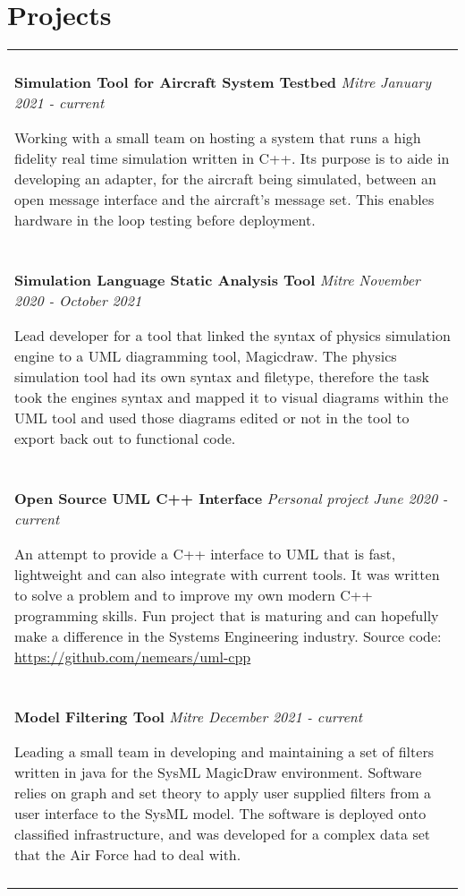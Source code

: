 \documentclass[10pt]{article}
\begin{document}
\section*{Projects}
\begin{tabular}{p{18.5cm}}
    \hline
    \multicolumn{1}{c}{} \\

    \large \textbf{Simulation Tool for Aircraft System Testbed} \normalsize \textit{Mitre \hfill January 2021 - current}

    \> Working with a small team on hosting a system that runs a high fidelity real time 
    simulation written in C++. Its purpose is to aide in developing an adapter, for the aircraft being simulated, between an open
    message interface and the aircraft's message set. This enables hardware in the loop testing before deployment.\\
    \multicolumn{1}{c}{} \\

    \large \textbf{Simulation Language Static Analysis Tool} \normalsize \textit{Mitre \hfill November 2020 - October 2021}  

    \> Lead developer for a tool that linked the syntax of physics simulation engine to a UML diagramming tool, Magicdraw. 
    The physics simulation tool had its own syntax and filetype, therefore the task took the engines syntax and mapped it 
    to visual diagrams within the UML tool and used those diagrams edited or not in the tool to export back out to functional code. \\
    \multicolumn{1}{c}{} \\

    \large \textbf{Open Source UML C++ Interface} \normalsize \textit{Personal project \hfill June 2020 - current}  

    \> An attempt to provide a C++ interface to UML that is fast, lightweight and can also integrate with current tools. It was written 
    to solve a problem and to improve my own modern C++ programming skills. Fun project that is maturing and can hopefully make a 
    difference in the Systems Engineering industry. Source code: \url{https://github.com/nemears/uml-cpp} \\
    \multicolumn{1}{c}{} \\

    \large \textbf{Model Filtering Tool} \normalsize \textit{Mitre \hfill December 2021 - current}  

    \> Leading a small team in developing and maintaining a set of filters written in java for the SysML MagicDraw environment. Software relies on 
    graph and set theory to apply user supplied filters from a user interface to the SysML model. The software is deployed onto classified 
    infrastructure, and was developed for a complex data set that the Air Force had to deal with.\\
    \multicolumn{1}{c}{} \\


\end{tabular}
\end{document}
